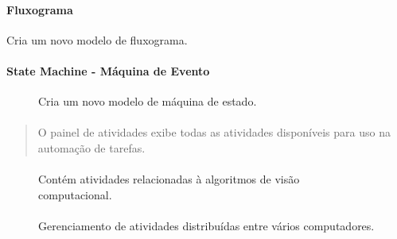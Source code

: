 \documentclass[letterpaper,10pt,brazil]{sphinxmanual}
\begin{document}
\paragraph{Fluxograma}
\label{\detokenize{interface_guide:fluxograma}}
\begin{figure}[htbp]
\centering

\noindent{}
\end{figure}

Cria um novo modelo de fluxograma.


\paragraph{State Machine - Máquina de Evento}
\label{\detokenize{interface_guide:state-machine-maquina-de-evento}}
\begin{figure}[htbp]
\centering
\capstart

\noindent{}
\caption{Cria um novo modelo de máquina de estado.}\label{\detokenize{interface_guide:id3}}\end{figure}


\paragraph{}
\label{\detokenize{interface_guide:painel-de-atividades}}\begin{quote}

O painel de atividades exibe todas as atividades disponíveis para uso na automação de tarefas.
\end{quote}


\paragraph{}
\label{\detokenize{interface_guide:computer-vision-visao-computacional}}
\begin{figure}[htbp]
\centering
\capstart

\noindent{}
\caption{Contém atividades relacionadas à algoritmos de visão computacional.}\label{\detokenize{interface_guide:id4}}\end{figure}


\paragraph{}
\label{\detokenize{interface_guide:orchestrator-orquestrador}}
\begin{figure}[htbp]
\centering
\capstart

\noindent{}
\caption{Gerenciamento de atividades distribuídas entre vários computadores.}\label{\detokenize{interface_guide:id5}}\end{figure}
\end{document}
